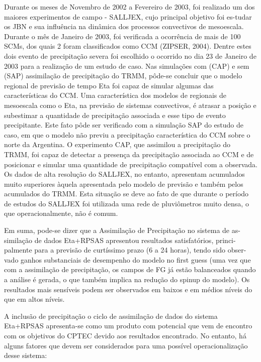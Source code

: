 Durante os meses de Novembro de 2002 a Fevereiro de 2003, foi realizado um dos maiores experimentos de campo - SALLJEX, cujo principal objetivo foi es-tudar os JBN e sua influência na dinâmica dos processos convectivos de mesoescala. Durante o mês de Janeiro de 2003, foi verificada a ocorrência de mais de 100 SCMs, dos quais 2 foram classificados como CCM (ZIPSER, 2004).  Dentre estes dois evento de precipitação severa foi escolhido o ocorrido no dia 23 de Janeiro de 2003 para a realização de um estudo de caso. Nas simulações com (CAP) e sem (SAP) assimilação de precipitação do TRMM, pôde-se concluir que o modelo regional de previsão de tempo Eta foi capaz de simular algumas das características do CCM. Uma característica dos modelos de regionais de mesoescala como o Eta, na previsão de sistemas convectivos, é atrasar a posição e subestimar a quantidade de precipitação associada e esse tipo de evento precipitante. Este fato pôde ser verificado com a simulação SAP do estudo de caso, em que o modelo não previu a precipitação característica do CCM sobre o norte da Argentina. O experimento CAP, que assimilou a precipitação do TRMM, foi capaz de detectar a presença da precipitação associada ao CCM e de posicionar e simular uma quantidade de precipitação compatível com a observada. Os dados de alta resolução do SALLJEX, no entanto, apresentam acumulados muito superiores àquela apresentada pelo modelo de previsão e também pelos acumulados do TRMM. Esta situação se deve ao fato de que durante o período de estudos do SALLJEX foi utilizada uma rede de pluviômetros muito densa, o que operacionalmente, não é comum.

Em suma, pode-se dizer que a Assimilação de Precipitação no sistema de as-similação de dados Eta+RPSAS apresentou resultados satisfatórios, princi-palmente para a previsão de curtíssimo prazo (6 a 24 horas), tendo sido obser-vado ganhos substanciais de desempenho do modelo no first guess (uma vez que com a assimilação de precipitação, os campos de FG já estão balanceados quando a análise é gerada, o que também implica na redução do spinup do modelo). Os resultados mais sensíveis podem ser observados em baixos e em médios níveis do que em altos níveis.

A inclusão de precipitação o ciclo de assimilação de dados do sistema Eta+RPSAS apresenta-se como um produto com potencial que vem de encontro com os objetivos do CPTEC devido aos resultados encontrado. No entanto, há alguns fatores que devem ser considerados para uma possível operacionalização desse sistema:

